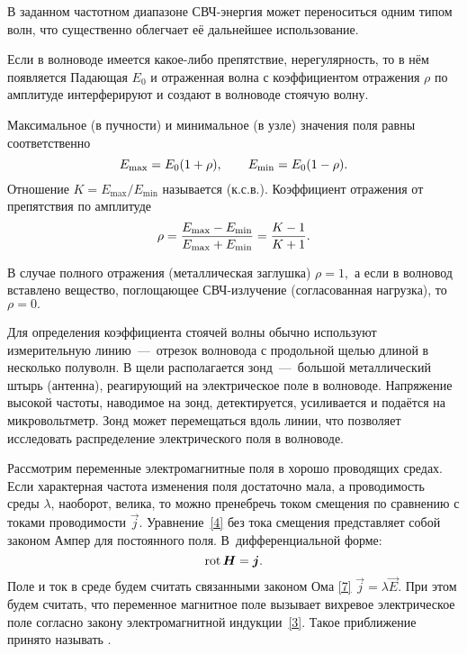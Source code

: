 В заданном частотном диапазоне СВЧ-энергия может переноситься одним типом волн,
что существенно облегчает её дальнейшее использование.

Если в волноводе имеется какое-либо препятствие, нерегулярность, то в нём
появляется  Падающая $E_0$ и отраженная волна с
коэффициентом отражения $\rho$ по амплитуде интерферируют и создают в волноводе
стоячую волну.

Максимальное (в пучности) и минимальное (в узле) значения поля равны
соответственно 
\begin{equation} \eqmark{2.0.5} 
E_{\text{max}}=E_0(1+\rho),
\qquad E_{\text{min}}=E_0(1-\rho). 
\end{equation} 
Отношение
$K=E_{\text{max}}/E_{\text{min}}$ называется  (к.с.в.). Коэффициент отражения от препятствия по амплитуде
\begin{equation} \eqmark{2.0.6}
\rho=\dfrac{E_{\text{max}}-E_{\text{min}}}{E_{\text{max}}+E_{\text{min}}}=\dfrac{K-1}{K+1}. 
\end{equation}

В случае полного отражения (металлическая заглушка) $\rho=1,$ а если в волновод
вставлено вещество, поглощающее СВЧ-­излучение (согласованная нагрузка), то
$\rho=0.$

Для определения коэффициента стоячей волны обычно используют измерительную
линию~---~отрезок волновода с продольной щелью длиной в несколько полуволн. В
щели располагается зонд~---~большой металлический штырь (антенна), реагирующий
на электрическое поле в волноводе. Напряжение высокой частоты, наводимое на
зонд, детектируется, усиливается и подаётся на микровольтметр. Зонд может
перемещаться вдоль линии, что позволяет исследовать распределение электрического
поля в волноводе.



Рассмотрим переменные электромагнитные поля в хорошо проводящих средах.
Если характерная частота изменения поля достаточно мала, а проводимость
среды $\lambda$, наоборот, велика, то можно пренебречь током смещения
по сравнению с токами проводимости $\vec{j}$.
Уравнение~\eqref{4} без тока смещения представляет собой законом Ампер 
для постоянного поля. В~дифференциальной форме:
\begin{equation}\eqmark{ampere-dif}
\Rot \vec{H} = \vec{j}.
\end{equation}
Поле и ток в среде будем считать связанными законом Ома \eqref{7} 
$\vec{j}=\lambda\vec{E}$.
При этом будем считать, что переменное магнитное поле вызывает
вихревое электрическое поле согласно закону электромагнитной индукции~\eqref{3}.
Такое приближение принято называть .



